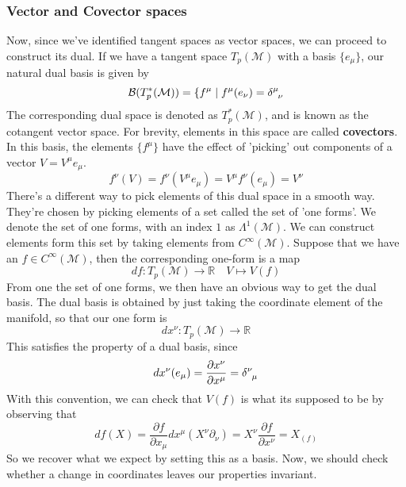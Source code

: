 \documentclass[11pt, a4paper]{article}   	%
\theoremstyle{slplain}
\newcommand{\R}{ \mathbb{R}}
\begin{document}
\subsubsection{Vector and Covector spaces} 
Now, since we've identified tangent spaces as vector spaces, we can proceed to construct its dual. 
If we have a tangent space $ T_p ( \mathcal{ M}) $ with a basis $\{ e_\mu  \}$, our natural dual basis is 
given by 
\[
\mathcal{B }( T_p^* ( \mathcal{M})) = \{ f^\mu  \mid f^\mu  ( e_\nu  ) = \delta \indices{^\mu _\nu  } 
\] The corresponding dual space is denoted as $T_p^* ( \mathcal{ M}) $, and is known as 
the cotangent vector space. 
For brevity, elements in this space are called \textbf{ covectors}. 
In this basis, the elements $ \{ f^\mu  \}$ have the effect of 'picking' out components of a vector $ V = V^\mu e_\mu  $. 
\[
f^\nu  ( V )  =f^\nu  ( V^\mu  e_\mu  )  = V^\mu  f^\nu  ( e_\mu )  = V^\nu  
\] There's a different way to pick elements of this dual space in a smooth way. 
They're chosen by picking elements of a set called the set of 'one forms'. 
We denote the set of one forms, with an index $1 $ as $ \Lambda^{1}( \mathcal{M }) $. 
We can construct elements form this set by taking elements from $ C^\infty ( \mathcal{M} )$. 
Suppose that we have an $ f \in C^\infty ( \mathcal{ M } ) $, then the corresponding one-form is a map 
\[
df : T_p ( \mathcal{ M}) \to  \R \quad V \mapsto V( f) 
\] From one the set of one forms, we then have an obvious way to get the dual basis. 
The dual basis is obtained by just taking the coordinate element of the manifold, so that our one form is 
\[
dx^\nu  : T_p ( \mathcal{ M }) \to  \R
\] This satisfies the property of a dual basis, since 
\[
dx^\nu ( e_\mu  )  = \frac{\partial x^\nu  }{\partial x^\mu  } = \delta \indices{^\nu _\mu  } 
\] With this convention, we can check that 
$ V ( f) $ is what its supposed to be by observing that
\[
df( X)  = \frac{\partial f}{\partial x_\mu} dx^\mu ( X^\nu \partial _\nu )  = X^\nu \frac{\partial f}{\partial x^\nu} = X_ ( f)  
\]  So we recover what we expect 
by setting this as a basis. Now, we should
check whether a change in coordinates leaves our properties invariant. 
\end{document}
